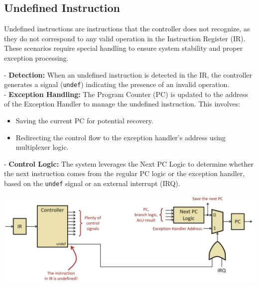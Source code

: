 \subsection{Undefined Instruction}

Undefined instructions are instructions that the controller does not recognize, as they do not correspond to any valid operation in the Instruction Register (IR). These scenarios require special handling to ensure system stability and proper exception processing.

\vspace{0.5cm}
\begin{minipage}[htp]{0.35\textwidth}
- \textbf{Detection:} When an undefined instruction is detected in the IR, the controller generates a signal (\texttt{undef}) indicating the presence of an invalid operation. \\ 
- \textbf{Exception Handling:} The Program Counter (PC) is updated to the address of the Exception Handler to manage the undefined instruction. This involves: \\
\begin{itemize}
\item Saving the current PC for potential recovery.
\item Redirecting the control flow to the exception handler's address using multiplexer logic.
\end{itemize}
- \textbf{Control Logic:} The system leverages the Next PC Logic to determine whether the next instruction comes from the regular PC logic or the exception handler, based on the \texttt{undef} signal or an external interrupt (IRQ).
\end{minipage}
\hfill
\vline
\hfill
\begin{minipage}[htp]{0.55\textwidth}
    \begin{center}
        \includegraphics[width=1.1\textwidth]{chapters/chapter2d/images/undefined.png}
    \end{center}
\end{minipage} \\
\vspace{0.5cm}
